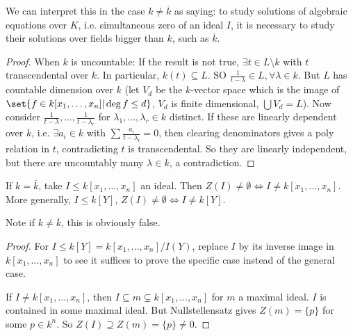 \documentclass{article}
\begin{document}

We can interpret this in the case $k \neq \overline{k}$ as saying: to study solutions of algebraic equations over $K$, i.e. simultaneous zero of an ideal $I$, it is necessary to study their solutions over fields bigger than $k$, such as $\overline{k}$.
\begin{proof}
    When $k$ is uncountable: If the result is not true, $\exists t \in L\setminus k$ with $t$ transcendental over $k$. In particular, $k(t) \subseteq L$. SO $\frac{1}{t-\lambda} \in L, \forall \lambda \in k$.
    But $L$ has countable dimension over $k$ (let $V_d$ be the $k$-vector space which is the image of $\set{f \in k[x_1, \dotsc, x_n] | \deg f \leq d}$, $V_d$ is finite dimensional, $\bigcup V_d = L$).
    Now consider $\frac{1}{t-\lambda}, \dotsc, \frac{1}{t-\lambda_r}$ for $\lambda_1, \dotsc, \lambda_r \in k$ distinct. If these are linearly dependent over $k$, i.e. $\exists a_i \in k$ with $\sum \frac{a_i}{t - \lambda_i} = 0$, then clearing denominators gives a poly relation in $t$, contradicting $t$ is transcendental.
    So they are linearly independent, but there are uncountably many $\lambda \in k$, a contradiction.
\end{proof}

\begin{cor}
    If $k = \overline{k}$, take $I \leq k[x_1, \dotsc, x_n]$ an ideal.
    Then $Z(I) \neq \emptyset \iff I \neq k[x_1, \dotsc, x_n]$. More generally, $I \leq k[Y]$, $Z(I) \neq \emptyset \iff I \neq k[Y]$.
\end{cor}
Note if $k \neq \overline{k}$, this is obviously false.

\begin{proof}
    For $I \leq k[Y] = k[x_1, \dotsc, x_n]/I(Y)$, replace $I$ by its inverse image in $k[x_1, \dotsc, x_n]$ to see it suffices to prove the specific case instead of the general case.

    If $I \neq k[x_1, \dotsc, x_n]$, then $I \subseteq m \subsetneq k[x_1, \dotsc, x_n]$ for $m$ a maximal ideal. $I$ is contained in some maximal ideal. But Nullstellensatz gives $Z(m) = \{p\}$ for some $p \in k^n$.
    So $Z(I) \supseteq Z(m) = \{p\} \neq 0$.
\end{proof}
\end{document}
